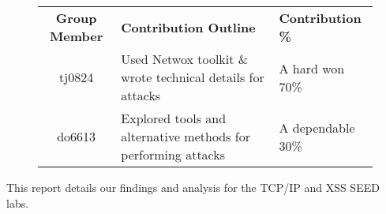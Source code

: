 \begin{figure}[h]
\centering
\begin{tabular}{|c|p{9.5cm}|l|}
\hline
{\bf Group Member} & {\bf Contribution Outline} & {\bf Contribution \%} \\
\hhline{|=|=|=|}
tj0824 & Used Netwox toolkit \& wrote technical details for attacks & A hard won 70\% \\
\hline
do6613 & Explored tools and alternative methods for performing attacks & A dependable 30\% \\
\hline
\end{tabular}
\end{figure}

This report details our findings and analysis for the TCP/IP and XSS SEED labs.